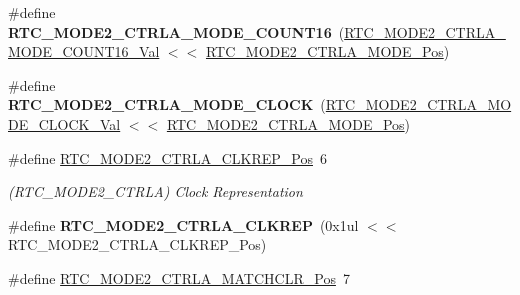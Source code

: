\begin{DoxyCompactItemize}
\item 
\hypertarget{group___s_a_m_l21___r_t_c_ga325ac6cb8b2c2e7a8ca6a98e81f2490e}{}\#define {\bfseries R\+T\+C\+\_\+\+M\+O\+D\+E2\+\_\+\+C\+T\+R\+L\+A\+\_\+\+M\+O\+D\+E\+\_\+\+C\+O\+U\+N\+T16}~(\hyperlink{group___s_a_m_l21___r_t_c_ga3d4a4512fa9a9209dffc315f2877e7e2}{R\+T\+C\+\_\+\+M\+O\+D\+E2\+\_\+\+C\+T\+R\+L\+A\+\_\+\+M\+O\+D\+E\+\_\+\+C\+O\+U\+N\+T16\+\_\+\+Val} $<$$<$ \hyperlink{group___s_a_m_l21___r_t_c_ga9e63063a02c833995e0bc78142f8122b}{R\+T\+C\+\_\+\+M\+O\+D\+E2\+\_\+\+C\+T\+R\+L\+A\+\_\+\+M\+O\+D\+E\+\_\+\+Pos})\label{group___s_a_m_l21___r_t_c_ga325ac6cb8b2c2e7a8ca6a98e81f2490e}

\item 
\hypertarget{group___s_a_m_l21___r_t_c_ga3ce9969b357a04e2cf8cd845da9b0dda}{}\#define {\bfseries R\+T\+C\+\_\+\+M\+O\+D\+E2\+\_\+\+C\+T\+R\+L\+A\+\_\+\+M\+O\+D\+E\+\_\+\+C\+L\+O\+C\+K}~(\hyperlink{group___s_a_m_l21___r_t_c_ga5425303ad1df9e5f93d15c62dd45ca6b}{R\+T\+C\+\_\+\+M\+O\+D\+E2\+\_\+\+C\+T\+R\+L\+A\+\_\+\+M\+O\+D\+E\+\_\+\+C\+L\+O\+C\+K\+\_\+\+Val} $<$$<$ \hyperlink{group___s_a_m_l21___r_t_c_ga9e63063a02c833995e0bc78142f8122b}{R\+T\+C\+\_\+\+M\+O\+D\+E2\+\_\+\+C\+T\+R\+L\+A\+\_\+\+M\+O\+D\+E\+\_\+\+Pos})\label{group___s_a_m_l21___r_t_c_ga3ce9969b357a04e2cf8cd845da9b0dda}

\item 
\hypertarget{group___s_a_m_l21___r_t_c_ga04458ee9630bdbc900f8c742dda200f6}{}\#define \hyperlink{group___s_a_m_l21___r_t_c_ga04458ee9630bdbc900f8c742dda200f6}{R\+T\+C\+\_\+\+M\+O\+D\+E2\+\_\+\+C\+T\+R\+L\+A\+\_\+\+C\+L\+K\+R\+E\+P\+\_\+\+Pos}~6\label{group___s_a_m_l21___r_t_c_ga04458ee9630bdbc900f8c742dda200f6}

\begin{DoxyCompactList}\small\item\em (R\+T\+C\+\_\+\+M\+O\+D\+E2\+\_\+\+C\+T\+R\+L\+A) Clock Representation \end{DoxyCompactList}\item 
\hypertarget{group___s_a_m_l21___r_t_c_ga4d831ae89e317566541953b5b7d9607c}{}\#define {\bfseries R\+T\+C\+\_\+\+M\+O\+D\+E2\+\_\+\+C\+T\+R\+L\+A\+\_\+\+C\+L\+K\+R\+E\+P}~(0x1ul $<$$<$ R\+T\+C\+\_\+\+M\+O\+D\+E2\+\_\+\+C\+T\+R\+L\+A\+\_\+\+C\+L\+K\+R\+E\+P\+\_\+\+Pos)\label{group___s_a_m_l21___r_t_c_ga4d831ae89e317566541953b5b7d9607c}

\item 
\hypertarget{group___s_a_m_l21___r_t_c_ga84d2da9fa0c1abd2d49c8cf3d265af64}{}\#define \hyperlink{group___s_a_m_l21___r_t_c_ga84d2da9fa0c1abd2d49c8cf3d265af64}{R\+T\+C\+\_\+\+M\+O\+D\+E2\+\_\+\+C\+T\+R\+L\+A\+\_\+\+M\+A\+T\+C\+H\+C\+L\+R\+\_\+\+Pos}~7\label{group___s_a_m_l21___r_t_c_ga84d2da9fa0c1abd2d49c8cf3d265af64}


\end{DoxyCompactItemize}
